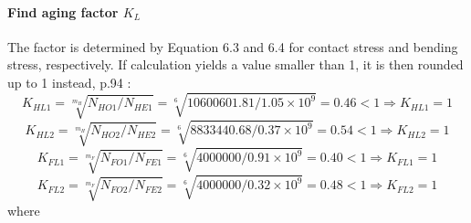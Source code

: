 \paragraph{Find aging factor $ K_L $}
The factor is determined by Equation 6.3 and 6.4 \cite{tk1} for contact stress and bending stress, respectively. If calculation yields a value smaller than 1, it is then rounded up to 1 instead, p.94 \cite{tk1}:\\
\[ K_{HL1} = \sqrt[m_H]{N_{HO1}/N_{HE1}} = \sqrt[6]{10600601.81/1.05 \times10^9} = 0.46 < 1 \Rightarrow K_{HL1} = 1\]
\[ K_{HL2} = \sqrt[m_H]{N_{HO2}/N_{HE2}} = \sqrt[6]{8833440.68/0.37 \times10^9} = 0.54 < 1 \Rightarrow K_{HL2} = 1\]
\[ K_{FL1} = \sqrt[m_F]{N_{FO1}/N_{FE1}} = \sqrt[6]{4000000/0.91 \times10^9} = 0.40 < 1 \Rightarrow K_{FL1} = 1\]
\[ K_{FL2} = \sqrt[m_F]{N_{FO2}/N_{FE2}} = \sqrt[6]{4000000/0.32 \times10^9} = 0.48 < 1 \Rightarrow K_{FL2} = 1\]
where
